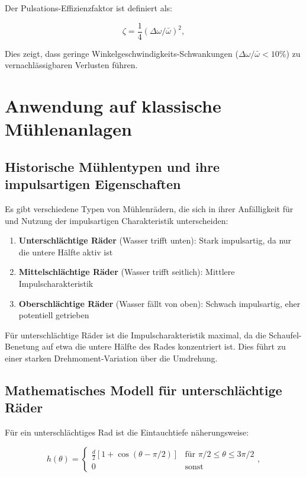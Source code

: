 \documentclass[a4paper,12pt]{article}
\theoremstyle{definition}
\begin{document}
Der Pulsations-Effizienzfaktor ist definiert als:

\begin{equation}
  \zeta = \frac{1}{4}(\Delta\omega / \bar{\omega})^2,
  \label{eq:zeta_puls}
\end{equation}

Dies zeigt, dass geringe Winkelgeschwindigkeits-Schwankungen ($\Delta\omega / \bar{\omega} < 10\%$) zu vernachlässigbaren Verlusten führen.

\section{Anwendung auf klassische Mühlenanlagen}

\subsection{Historische Mühlentypen und ihre impulsartigen Eigenschaften}

Es gibt verschiedene Typen von Mühlenrädern, die sich in ihrer Anfälligkeit für und Nutzung der impulsartigen Charakteristik unterscheiden:

\begin{enumerate}
  \item \textbf{Unterschlächtige Räder} (Wasser trifft unten): Stark impulsartig, da nur die untere Hälfte aktiv ist
  \item \textbf{Mittelschlächtige Räder} (Wasser trifft seitlich): Mittlere Impulscharakteristik
  \item \textbf{Oberschlächtige Räder} (Wasser fällt von oben): Schwach impulsartig, eher potentiell getrieben
\end{enumerate}

Für unterschlächtige Räder ist die Impulscharakteristik maximal, da die Schaufel-Benetung auf etwa die untere Hälfte des Rades konzentriert ist. Dies führt zu einer starken Drehmoment-Variation über die Umdrehung.

\subsection{Mathematisches Modell für unterschlächtige Räder}

Für ein unterschlächtiges Rad ist die Eintauchtiefe näherungsweise:

\begin{equation}
  h(\theta) = \begin{cases}
    \frac{d}{2}[1 + \cos(\theta - \pi/2)] & \text{für } \pi/2 \leq \theta \leq 3\pi/2 \\
    0 & \text{sonst}
  \end{cases},
  \label{eq:h_unterschlaechtig}
\end{equation}
\end{document}
